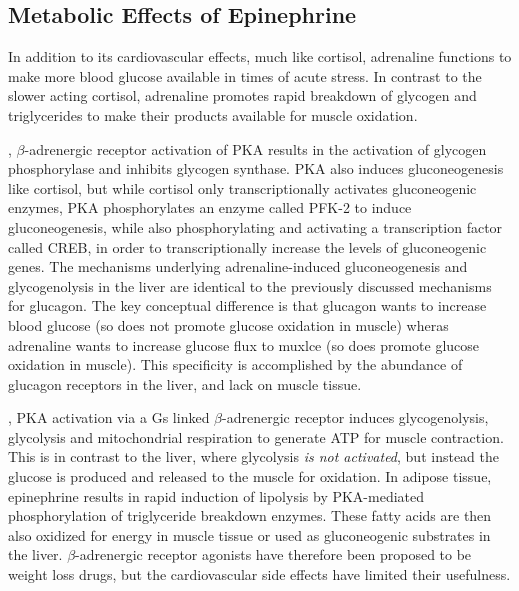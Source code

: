 \documentclass{tufte-handout}
\begin{document}
\subsection{Metabolic Effects of Epinephrine}

In addition to its cardiovascular effects, much like cortisol, adrenaline functions to make more blood glucose available in times of acute stress.  In contrast to the slower acting cortisol, adrenaline promotes rapid breakdown of glycogen and triglycerides to make their products available for muscle oxidation.

, $\beta$-adrenergic receptor activation of PKA results in the activation of glycogen phosphorylase and inhibits glycogen synthase.  PKA also induces gluconeogenesis like cortisol, but while cortisol only  transcriptionally activates gluconeogenic enzymes, PKA phosphorylates an enzyme called PFK-2 to induce gluconeogenesis, while also phosphorylating and activating a transcription factor called CREB, in order to transcriptionally increase the levels of gluconeogenic genes.  The mechanisms underlying adrenaline-induced gluconeogenesis and glycogenolysis in the liver are identical to the previously discussed mechanisms for glucagon.  The key conceptual difference is that glucagon wants to increase blood glucose (so does not promote glucose oxidation in muscle) wheras adrenaline wants to increase glucose flux to muxlce (so does promote glucose oxidation in muscle).  This specificity is accomplished by the abundance of glucagon receptors in the liver, and lack on muscle tissue.

, PKA activation via a Gs linked $\beta$-adrenergic receptor induces glycogenolysis, glycolysis and mitochondrial respiration to generate ATP for muscle contraction.  This is in contrast to the liver, where glycolysis \emph{is not activated}, but instead the glucose is produced and released  to the muscle for oxidation.  In adipose tissue, epinephrine results in rapid induction of lipolysis by PKA-mediated phosphorylation of triglyceride breakdown enzymes.  These fatty acids are then also oxidized for energy in muscle tissue or used as gluconeogenic substrates in the liver.  $\beta$-adrenergic receptor agonists have therefore been proposed to be weight loss drugs, but the cardiovascular side effects have limited their usefulness.
\end{document}
